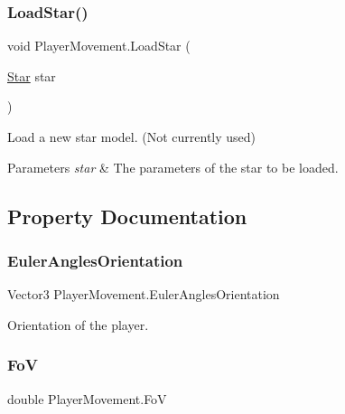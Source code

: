 \subsubsection{\texorpdfstring{LoadStar()}{LoadStar()}}
{\footnotesize\ttfamily void Player\+Movement.\+Load\+Star (\begin{DoxyParamCaption}\item[{\mbox{\hyperlink{struct_star}{Star}}}]{star }\end{DoxyParamCaption})}



Load a new star model. (Not currently used) 


\begin{DoxyParams}{Parameters}
{\em star} & The parameters of the star to be loaded.\\
\hline
\end{DoxyParams}


\subsection{Property Documentation}
\mbox{\label{class_player_movement_ad6d9510889cdc5425dfe09bf03636517}} 
\subsubsection{\texorpdfstring{EulerAnglesOrientation}{EulerAnglesOrientation}}
{\footnotesize\ttfamily Vector3 Player\+Movement.\+Euler\+Angles\+Orientation\hspace{0.3cm}{\ttfamily [get]}}



Orientation of the player. 

\mbox{\label{class_player_movement_a37d3be37d31d77c38902c467cd081df2}} 
\subsubsection{\texorpdfstring{FoV}{FoV}}
{\footnotesize\ttfamily double Player\+Movement.\+FoV\hspace{0.3cm}{\ttfamily [get]}}



